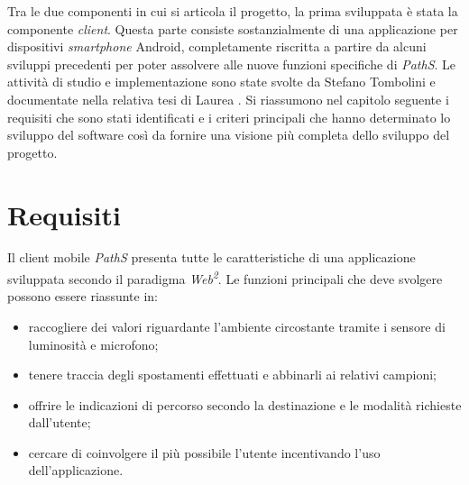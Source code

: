 Tra le due componenti in cui si articola il progetto, la prima sviluppata è stata la componente \emph{client}. Questa parte consiste sostanzialmente di una applicazione per dispositivi \emph{smartphone} Android, completamente riscritta a partire da alcuni sviluppi precedenti per poter assolvere alle nuove funzioni specifiche di \emph{PathS}. Le attività di studio e implementazione sono state svolte da Stefano Tombolini e documentate nella relativa tesi di Laurea \cite{tesitombolini}. Si riassumono nel capitolo seguente i requisiti che sono stati identificati e i criteri principali che hanno determinato lo sviluppo del software così da fornire una visione più completa dello sviluppo del progetto. 

\section{Requisiti}
Il client mobile \emph{PathS} presenta tutte le caratteristiche di una applicazione sviluppata secondo il paradigma \emph{Web\textsuperscript{2}}. 
Le funzioni principali che deve svolgere possono essere riassunte in:
\begin{itemize}
\item raccogliere dei valori riguardante l'ambiente circostante tramite i sensore di luminosità e microfono;
\item tenere traccia degli spostamenti effettuati e abbinarli ai relativi campioni;
\item offrire le indicazioni di percorso secondo la destinazione e le modalità richieste dall'utente;
\item cercare di coinvolgere il più possibile l'utente incentivando l'uso dell'applicazione.
\end{itemize}


